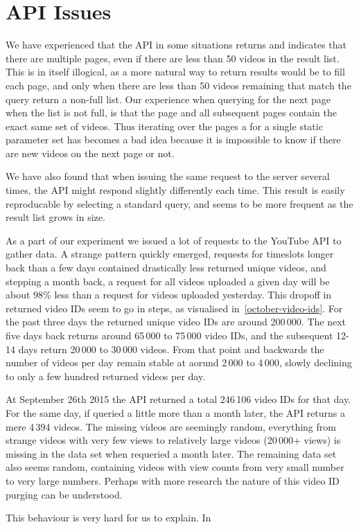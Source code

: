 \section{API Issues}
We have experienced that the API in some situations returns and indicates that
there are multiple pages, even if there are less than 50 videos in the result
list. This is in itself illogical, as a more natural way to return results would
be to fill each page, and only when there are less than 50 videos remaining that
match the query return a non-full list. Our experience when querying for the next
page when the list is not full, is that the page and all subsequent pages contain
the exact same set of videos. Thus iterating over the pages a  for a single
static parameter set has becomes a bad idea because it is impossible to know if
there are new videos on the next page or not.  %

We have also found that when issuing the same request to the server several
times, the API might respond slightly differently each time. This result is
easily reproducable by selecting a standard query, and seems to be more
frequent as the result list grows in size. %

As a part of our experiment we issued a lot of requests to the YouTube API to
gather data. A strange pattern quickly emerged, requests for timeslots longer
back than a few days contained drastically less returned unique videos, and 
stepping a month back, a request for all videos uploaded a given day will be 
about 98\% less than a request for videos uploaded yesterday. This dropoff in
returned video IDs seem to go in steps, as visualised
in~\cref{october-video-ids}. For the past three days the returned unique video
IDs are around 200\,000. The next five days back returns around 65\,000 to 75\,000
video IDs, and the subsequent 12-14 days return 20\,000 to 30\,000 videos. From
that point and backwards the number of videos per day remain stable at aorund
2\,000 to 4\,000, slowly declining to only a few hundred returned videos per day.

At September 26th 2015 the API returned a total 246\,106 video IDs for that day.
For the same day, if queried a little more than a month later, the API returns
a mere 4\,394 videos. The missing videos are seemingly random, everything from 
strange videos with very few views to relatively large videos (20\,000+ views)
is missing in the data set when requeried a month later. The remaining data set
also seems random, containing videos with view counts from very small number to
very large numbers. Perhaps with more research the nature of this video ID
purging can be understood.

This behaviour is very hard for us to explain. In 


